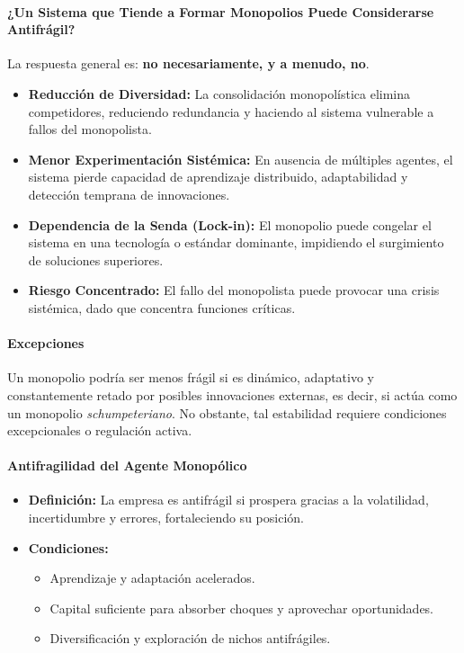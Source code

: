 \documentclass[a4paper,12pt]{article}
\begin{document}
\paragraph{¿Un Sistema que Tiende a Formar Monopolios Puede Considerarse Antifrágil?}

La respuesta general es: \textbf{no necesariamente, y a menudo, no}.

\begin{itemize}
    \item \textbf{Reducción de Diversidad:} La consolidación monopolística elimina competidores, reduciendo redundancia y haciendo al sistema vulnerable a fallos del monopolista.
    
    \item \textbf{Menor Experimentación Sistémica:} En ausencia de múltiples agentes, el sistema pierde capacidad de aprendizaje distribuido, adaptabilidad y detección temprana de innovaciones.
    
    \item \textbf{Dependencia de la Senda (Lock-in):} El monopolio puede congelar el sistema en una tecnología o estándar dominante, impidiendo el surgimiento de soluciones superiores.
    
    \item \textbf{Riesgo Concentrado:} El fallo del monopolista puede provocar una crisis sistémica, dado que concentra funciones críticas.
\end{itemize}

\paragraph{Excepciones}

Un monopolio podría ser menos frágil si es dinámico, adaptativo y constantemente retado por posibles innovaciones externas, es decir, si actúa como un monopolio \textit{schumpeteriano}. No obstante, tal estabilidad requiere condiciones excepcionales o regulación activa.

\paragraph{Antifragilidad del Agente Monopólico}

\begin{itemize}
    \item \textbf{Definición:} La empresa es antifrágil si prospera gracias a la volatilidad, incertidumbre y errores, fortaleciendo su posición.
    
    \item \textbf{Condiciones:}
    \begin{itemize}
        \item Aprendizaje y adaptación acelerados.
        \item Capital suficiente para absorber choques y aprovechar oportunidades.
        \item Diversificación y exploración de nichos antifrágiles.
    \end{itemize}
\end{itemize}
\end{document}
